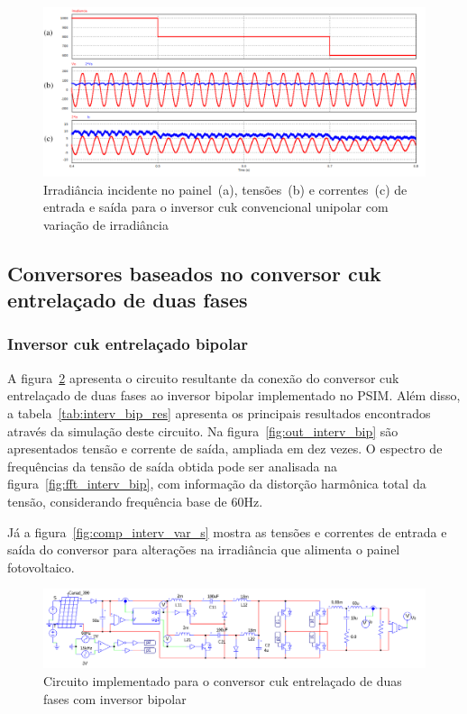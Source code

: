 \documentclass[
	12pt,				%
	openright,			%
	twoside,			%
	a4paper,			%
	english,			%
	french,				%
	spanish,			%
	brazil,				%
	]{abntex2}
\begin{document}
\begin{figure}[H]%
	\captionsetup{justification=centering}
	\centering
		\includegraphics[width= \linewidth]{comp_conv_var_s_unip}
		\caption{Irradiância incidente no painel~(a), tensões~(b) e correntes~(c) de entrada e saída para o inversor cuk convencional unipolar com variação de irradiância}
		\label{fig:comp_conv_var_s_unip}
\end{figure}

\subsection{Conversores baseados no conversor cuk entrelaçado de duas fases}

\subsubsection{Inversor cuk entrelaçado bipolar}

A figura~\ref{fig:comp_interv_circ_clean} apresenta o circuito resultante da conexão do conversor cuk entrelaçado de duas fases ao inversor bipolar implementado no PSIM. Além disso, a tabela~\ref{tab:interv_bip_res} apresenta os principais resultados encontrados através da simulação deste circuito. Na figura~\ref{fig:out_interv_bip} são apresentados tensão e corrente de saída, ampliada em dez vezes. O espectro de frequências da tensão de saída obtida pode ser analisada na figura~\ref{fig:fft_interv_bip},  com informação da distorção harmônica total da tensão, considerando frequência base de 60Hz.

Já a figura~\ref{fig:comp_interv_var_s} mostra as tensões e correntes de entrada e saída do conversor para alterações na irradiância que alimenta o painel fotovoltaico.

\begin{figure}[H]%
	\captionsetup{justification=centering}
	\centering
		\includegraphics[width= \linewidth]{comp_interv_circ_clean}
		\caption{Circuito implementado para o conversor cuk entrelaçado de duas fases com inversor bipolar}
		\label{fig:comp_interv_circ_clean}
\end{figure}
\end{document}
